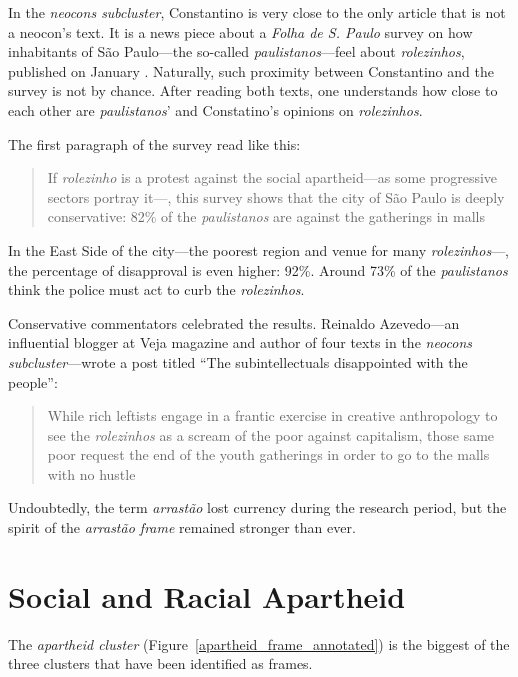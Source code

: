 In the \emph{neocons subcluster}, Constantino is very close to the only article that is not a neocon's text. It is a news piece about a \emph{Folha de S. Paulo} survey on how inhabitants of São Paulo---the so-called \emph{paulistanos}---feel about \emph{rolezinhos}, published on January . Naturally, such proximity between Constantino and the survey is not by chance. After reading both texts, one understands how close to each other are \emph{paulistanos}' and Constatino's opinions on \emph{rolezinhos}.

The first paragraph of the survey read like this: \blockcquote{folha_datafolha}[.]{If \emph{rolezinho} is a protest against the social apartheid---as some progressive sectors portray it---, this survey shows that the city of São Paulo is deeply conservative: 82\% of the \emph{paulistanos} are against the gatherings in malls} In the East Side of the city---the poorest region and venue for many \emph{rolezinhos}---, the percentage of disapproval is even higher: 92\%. Around 73\% of the \emph{paulistanos} think the police must act to curb the \emph{rolezinhos}.

Conservative commentators celebrated the results. Reinaldo Azevedo---an influential blogger at Veja magazine and author of four texts in the \emph{neocons subcluster}---wrote a post titled \enquote{The subintellectuals  disappointed with the people}: \blockcquote{reinaldo_datafolha}[.]{While rich leftists engage in a frantic exercise in creative anthropology to see the \emph{rolezinhos} as a scream of the poor against capitalism, those same poor request the end of the youth gatherings in order to go to the malls with no hustle}

Undoubtedly, the term \emph{arrastão} lost currency during the research period, but the spirit of the \emph{arrastão frame} remained stronger than ever.

\section{Social and Racial Apartheid}
\label{sec:apartheid}

The \emph{apartheid cluster} (Figure~\ref{apartheid_frame_annotated}) is the biggest of the three clusters that have been identified as frames.


